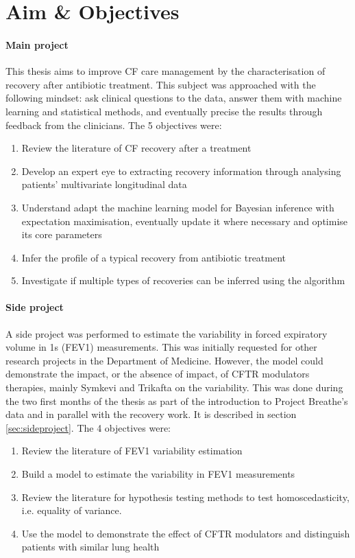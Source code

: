 \chapter{Aim \& Objectives}
\label{sec:obj}

\subsubsection{Main project}
This thesis aims to improve CF care management by the characterisation of recovery after antibiotic treatment. This subject was approached with the following mindset: ask clinical questions to the data, answer them with machine learning and statistical methods, and eventually precise the results through feedback from the clinicians. The 5 objectives were:

\begin{enumerate}
    \item Review the literature of CF recovery after a treatment
    \item Develop an expert eye to extracting recovery information through analysing patients' multivariate longitudinal data
    \item Understand adapt the machine learning model for Bayesian inference with expectation maximisation, eventually update it where necessary and optimise its core parameters
    \item Infer the profile of a typical recovery from antibiotic treatment
    \item Investigate if multiple types of recoveries can be inferred using the algorithm
\end{enumerate}

\subsubsection{Side project}
A side project was performed to estimate the variability in forced expiratory volume in 1s (FEV1) measurements. This was initially requested for other research projects in the Department of Medicine. However, the model could demonstrate the impact, or the absence of impact, of  CFTR modulators therapies, mainly Symkevi and Trikafta on the variability. This was done during the two first months of the thesis as part of the introduction to Project Breathe's data and in parallel with the recovery work. It is described in section \ref{sec:sideproject}. The 4 objectives were:
\begin{enumerate}
    \item Review the literature of FEV1 variability estimation
    \item Build a model to estimate the variability in FEV1 measurements
    \item Review the literature for hypothesis testing methods to test homoscedasticity, i.e. equality of variance.
    \item Use the model to demonstrate the effect of CFTR modulators and distinguish patients with similar lung health
\end{enumerate}